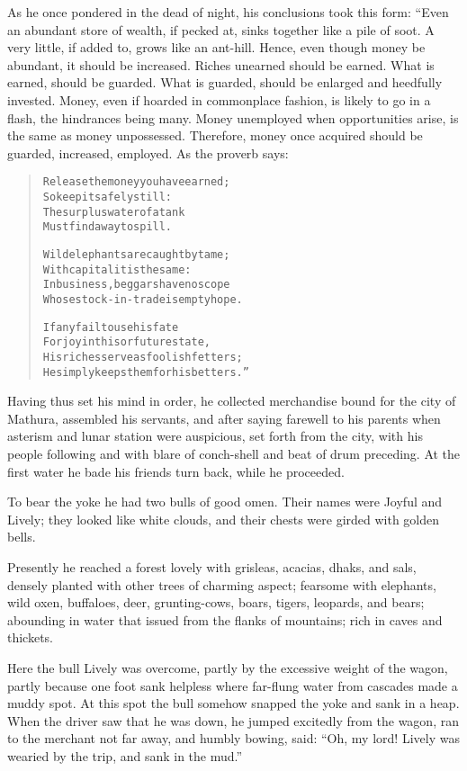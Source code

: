 \documentclass[article, twoside, 14pt]{memoir}
\renewenvironment{verbatim}{%
\begin{quote}%
\vskip -10pt%
\begin{alltt}\normalfont\large}{\end{alltt}%
\end{quote}%
\vskip -10pt
} %
\begin{document}
As he once pondered in the dead of night, his conclusions took this
form: “Even an abundant store of wealth, if pecked at, sinks
together like a pile of soot. A very little, if added to, grows
like an ant-hill. Hence, even though money be abundant, it should
be increased. Riches unearned should be earned. What is earned,
should be guarded. What is guarded, should be enlarged and
heedfully invested. Money, even if hoarded in commonplace fashion,
is likely to go in a flash, the hindrances being many. Money
unemployed when opportunities arise, is the same as money
unpossessed. Therefore, money once acquired should be guarded,
increased, employed. As the proverb says:

\begin{verbatim}
Release the money you have earned;
    So keep it safely still:
The surplus water of a tank
    Must find a way to spill.

Wild elephants are caught by tame;
With capital it is the same:
In business, beggars have no scope
Whose stock-in-trade is empty hope.

If any fail to use his fate
For joy in this or future state,
His riches serve as foolish fetters;
He simply keeps them for his betters.”
\end{verbatim}
Having thus set his mind in order, he collected merchandise bound
for the city of Mathura, assembled his servants, and after saying
farewell to his parents when asterism and lunar station were
auspicious, set forth from the city, with his people following and
with blare of conch-shell and beat of drum preceding. At the first
water he bade his friends turn back, while he proceeded.

To bear the yoke he had two bulls of good omen. Their names were
Joyful and Lively; they looked like white clouds, and their chests
were girded with golden bells.

Presently he reached a forest lovely with grisleas, acacias,
dhaks, and sals, densely planted with other trees of charming
aspect; fearsome with elephants, wild oxen, buffaloes, deer,
grunting-cows, boars, tigers, leopards, and bears; abounding in
water that issued from the flanks of mountains; rich in caves and
thickets.

Here the bull Lively was overcome, partly by the excessive weight
of the wagon, partly because one foot sank helpless where far-flung
water from cascades made a muddy spot. At this spot the bull
somehow snapped the yoke and sank in a heap. When the driver saw
that he was down, he jumped excitedly from the wagon, ran to the
merchant not far away, and humbly bowing, said:
``Oh, my lord! Lively was wearied by the trip, and sank in the mud.''
\end{document}
